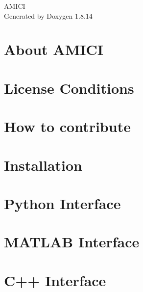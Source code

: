 \documentclass[twoside]{article}
\newcommand{\+}{\discretionary{\mbox{\scriptsize$\hookleftarrow$}}{}{}}
\begin{document}
\hypersetup{pageanchor=false,
             bookmarksnumbered=true,
             pdfencoding=unicode
            }
\begin{titlepage}
\vspace*{7cm}
\begin{center}%
{\Large A\+M\+I\+CI }\\
\vspace*{1cm}
{\large Generated by Doxygen 1.8.14}\\
\end{center}
\end{titlepage}
\tableofcontents
{}
\hypersetup{pageanchor=true}

\section{About A\+M\+I\+CI}
\label{index}\hypertarget{index}{}
\section{License Conditions}
\label{md__l_i_c_e_n_s_e}

\section{How to contribute}
\label{md__c_o_n_t_r_i_b_u_t_i_n_g}

\section{Installation}
\label{md__i_n_s_t_a_l_l}

\section{Python Interface}
\label{python_interface}

\section{M\+A\+T\+L\+AB Interface}
\label{matlab_interface}

\section{C++ Interface}
\label{md_documentation__c_p_p}

\end{document}
